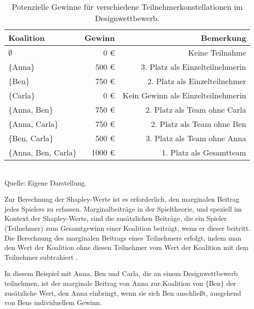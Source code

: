 \begin{table}[!h]
  \caption{Potenzielle Gewinne für verschiedene Teilnehmerkonstellationen im\\Designwettbewerb.}
  \footnotesize
  \begin{tabularx}{\textwidth}{Xrr}
  \toprule
  Koalition & Gewinn & Bemerkung \\
  \midrule
  $\emptyset$ & 0 \euro & Keine Teilnahme \\
  $\{$Anna$\}$ & 500 \euro & 3. Platz als Einzelteilnehmerin \\
  $\{$Ben$\}$ & 750 \euro & 2. Platz als Einzelteilnehmer \\
  $\{$Carla$\}$ & 0 \euro & Kein Gewinn als Einzelteilnehmerin \\
  $\{$Anna, Ben$\}$ & 750 \euro & 2. Platz als Team ohne Carla \\
  $\{$Anna, Carla$\}$ & 750 \euro & 2. Platz als Team ohne Ben \\
  $\{$Ben, Carla$\}$ & 500 \euro & 3. Platz als Team ohne Anna \\
  $\{$Anna, Ben, Carla$\}$ & 1000 \euro & 1. Platz als Gesamtteam \\
  \bottomrule
  \end{tabularx}
  \label{tab:shapley_example}
  \normalsize\\
  Quelle: Eigene Darstellung.
\end{table}

Zur Berechnung der Shapley-Werte ist es erforderlich, den marginalen Beitrag jedes Spielers zu erfassen.
Marginalbeiträge in der Spieltheorie, und speziell im Kontext der Shapley-Werte, sind die zusätzlichen Beiträge, 
die ein Spieler (Teilnehmer) zum Gesamtgewinn einer Koalition beiträgt, wenn er dieser beitritt. 
Die Berechnung des marginalen Beitrags eines Teilnehmers erfolgt, indem man den Wert der Koalition ohne diesen Teilnehmer 
vom Wert der Koalition mit dem Teilnehmer subtrahiert \cite[S. 18]{Molnar_2023}.

In diesem Beispiel mit Anna, Ben und Carla, die an einem Designwettbewerb teilnehmen, ist der marginale Beitrag von 
Anna zur Koalition von $\{$Ben$\}$ der zusätzliche Wert, den Anna einbringt, wenn sie sich Ben anschließt, 
ausgehend von Bens individuellem Gewinn.

